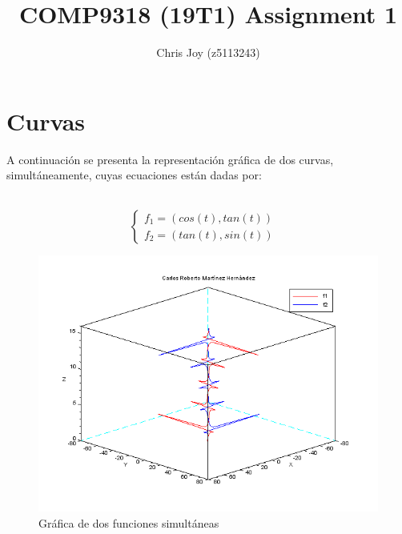 \documentclass[12pt]{article}
\begin{document}
 
 
\title{COMP9318 (19T1) Assignment 1}
\author{Chris Joy (z5113243)}

\maketitle
\section{Curvas}
A continuación se presenta la representación gráfica de dos curvas, simultáneamente, cuyas ecuaciones están dadas por:


\
\[\left\{ \begin{array}{rcl}
f_{1}=(cos(t),tan(t))
\\
f_{2}=(tan(t),sin(t)) 
& 
\end{array}
\right. \]


\begin{figure}[h]
\centering
\includegraphics[scale=0.65]{Images/curva4.png} 
\caption{Gráfica de dos funciones simultáneas}
\label{etiqueta}
\end{figure}


 
\end{document}
